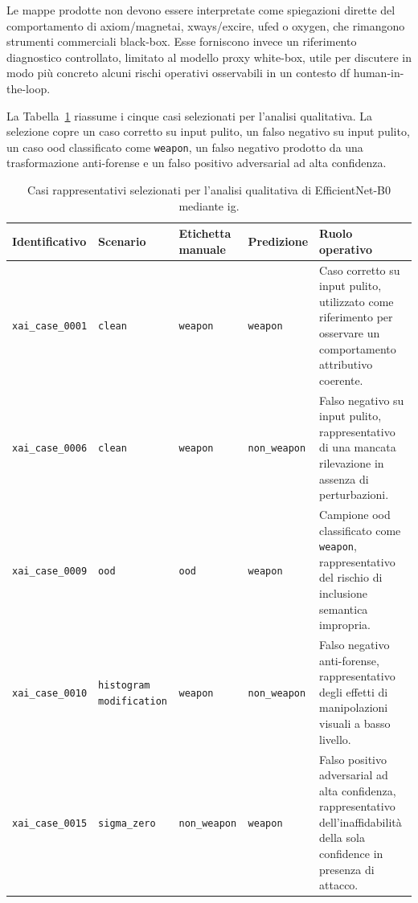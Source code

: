 Le mappe prodotte non devono essere interpretate come spiegazioni dirette del
comportamento di \gls{axiom}/\gls{magnetai}, \gls{xways}/\gls{excire},
\gls{ufed} o \gls{oxygen}, che rimangono strumenti commerciali black-box. Esse
forniscono invece un riferimento diagnostico controllato, limitato al modello
proxy white-box, utile per discutere in modo più concreto alcuni rischi
operativi osservabili in un contesto \gls{df} human-in-the-loop.

La Tabella~\ref{tab:results-xai-cases} riassume i cinque casi selezionati per
l'analisi qualitativa. La selezione copre un caso corretto su input pulito, un
falso negativo su input pulito, un caso \gls{ood} classificato come
\texttt{weapon}, un falso negativo prodotto da una trasformazione anti-forense
e un falso positivo adversarial ad alta confidenza.

\begin{table}[htbp]
\centering
\small
\renewcommand{\arraystretch}{1.15}
\begin{tabular}{p{} p{} p{} p{} p{}}
\toprule
\textbf{Identificativo} &
\textbf{Scenario} &
\textbf{Etichetta manuale} &
\textbf{Predizione} &
\textbf{Ruolo operativo} \\
\midrule
\texttt{xai\_case\_0001} &
\texttt{clean} &
\texttt{weapon} &
\texttt{weapon} &
Caso corretto su input pulito, utilizzato come riferimento per osservare un comportamento attributivo coerente. \\
\texttt{xai\_case\_0006} &
\texttt{clean} &
\texttt{weapon} &
\texttt{non\_weapon} &
Falso negativo su input pulito, rappresentativo di una mancata rilevazione in assenza di perturbazioni. \\
\texttt{xai\_case\_0009} &
\texttt{ood} &
\texttt{ood} &
\texttt{weapon} &
Campione \gls{ood} classificato come \texttt{weapon}, rappresentativo del rischio di inclusione semantica impropria. \\
\texttt{xai\_case\_0010} &
\texttt{histogram modification} &
\texttt{weapon} &
\texttt{non\_weapon} &
Falso negativo anti-forense, rappresentativo degli effetti di manipolazioni visuali a basso livello. \\
\texttt{xai\_case\_0015} &
\texttt{sigma\_zero} &
\texttt{non\_weapon} &
\texttt{weapon} &
Falso positivo adversarial ad alta confidenza, rappresentativo dell'inaffidabilità della sola confidence in presenza di attacco. \\
\bottomrule
\end{tabular}
\caption{Casi rappresentativi selezionati per l'analisi qualitativa di EfficientNet-B0 mediante \gls{ig}.}
\label{tab:results-xai-cases}
\end{table}

